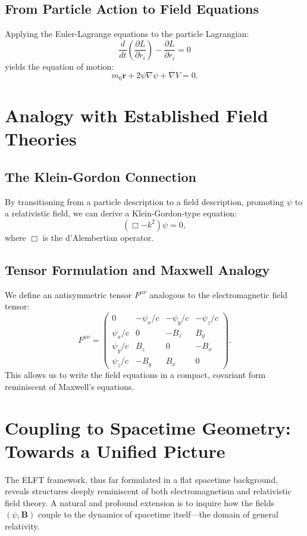 \documentclass[12pt, a4paper]{article}
\begin{document}
\subsection{From Particle Action to Field Equations}
Applying the Euler-Lagrange equations to the particle Lagrangian:
\[
\frac{d}{dt}\left( \frac{\partial L}{\partial \dot{r}_i} \right) - \frac{\partial L}{\partial r_i} = 0
\]
yields the equation of motion:
\begin{equation}
m_0 \ddot{\mathbf{r}} + 2\psi \nabla \psi + \nabla V = 0.
\end{equation}

\section{Analogy with Established Field Theories}

\subsection{The Klein-Gordon Connection}
By transitioning from a particle description to a field description, promoting $\psi$ to a relativistic field, we can derive a Klein-Gordon-type equation:
\begin{equation}
\left( \Box - k^2 \right)\psi = 0,
\end{equation}
where $\Box$ is the d'Alembertian operator.

\subsection{Tensor Formulation and Maxwell Analogy}
We define an antisymmetric tensor $F^{\mu\nu}$ analogous to the electromagnetic field tensor:
\[
F^{\mu\nu} = \begin{pmatrix}
0 & -\psi_x/c & -\psi_y/c & -\psi_z/c \\
\psi_x/c & 0 & -B_z & B_y \\
\psi_y/c & B_z & 0 & -B_x \\
\psi_z/c & -B_y & B_x & 0
\end{pmatrix}.
\]
This allows us to write the field equations in a compact, covariant form reminiscent of Maxwell's equations.

\section{Coupling to Spacetime Geometry: Towards a Unified Picture}
\label{sec:gr_coupling}

The ELFT framework, thus far formulated in a flat spacetime background, reveals structures deeply reminiscent of both electromagnetism and relativistic field theory. A natural and profound extension is to inquire how the fields $(\psi, \mathbf{B})$ couple to the dynamics of spacetime itself—the domain of general relativity.
\end{document}
